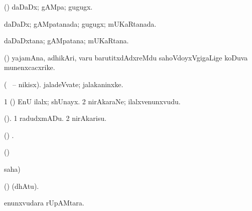 \bentry
{}
\gl{\nA}
\bmng
(\AmA) daDaDx; gAMpa; gugugx. 
\emng
\eentry

\bentry
{}
\gl{\gu}
\bmng
daDaDx; gAMpatanada; gugugx; mUKaRtanada. 
\emng
\eentry

\bentry
{}
\gl{\nA}
\bmng
daDaDxtana; gAMpatana; mUKaRtana. 
\emng
\eentry

\bentry
{}
\gl{\BAavayx}
\bmng
(\ashi) yajamAna, adhikAri, \mo varu barutitxdAdxreMdu sahoVdoyxVgigaLige koDuva munenxcacxrike. 
\emng
\eentry

\bentry
{}
\gl{\nA}
\bmng
(\sitxrXV\  \ucAcx-- nikisx). jaladeVvate; jalakaninxke. 
\emng
\eentry

\bentry
{}
\gl{\nA}
\bmng
\bnum
\num{1} (\ashi) EnU ilalx; shUnayx. 
\num{2} nirAkaraNe; ilalxvenunxvudu. 
\enum
\emng
\eentry

\bentry
{}
\gl{\sakirx}
\bmng
(\ashi). 
\bnum
\num{1} radudxmADu. 
\num{2} nirAkarisu. 
\enum
\emng
\eentry

\bentry
{}
\gl{\saMkiSx}
\bmng
(\ame) . 
\emng
\eentry

\bentry
{}
\gl{\saMkiSx}
\bmng
(\ame)  
\emng
\eentry

\bentry
{}
\gl{\saMkiSx}
\bmng
{} 
\emng
\eentry

\bentry
{}
\gl{\saMkiSx}
\bmng
{} 
\emng
\eentry

\bentry
{}
\gl{\saMkiSx}
\bmng
{} saha)  
\emng
\eentry

\bentry
{}
\gl{\saMkiSx}
\bmng
{} 
\emng
\eentry

\bentry
{}
\gl{\saMkiSx}
\bmng
{} 
\emng
\eentry

\bentry
{}
\pron{}
\gl{\saMkeV}
\bmng
(\ravi)  (dhAtu). 
\emng
\eentry

\bentry
{}
\gl{\nA}
\bmng
{} enunxvudara rUpAMtara. 
\emng
\eentry

